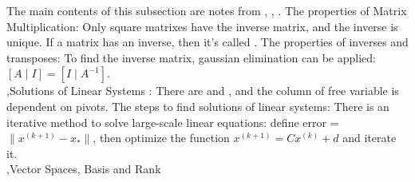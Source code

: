 \documentclass[12pt]{report}
\begin{document}
The main contents of this subsection are notes from \cite{deisenroth2020mathematics}, \cite{axler2023linear}, \cite{petersen2008matrix}.
The properties of Matrix Multiplication:
Only square matrixes have the inverse matrix, and the inverse is unique. If a matrix has an inverse, then it's called .
The properties of inverses and transposes:
To find the inverse matrix, gaussian elimination can be applied: $[A\mid I]=[I\mid A^{-1}]$.\\
\sep{Solutions of Linear Systems}
:
There are  and , and the column of free variable is dependent on pivots. The steps to find solutions of linear systems:
There is an iterative method to solve large-scale linear equations:
define error = $\|x^{(k+1)}-x_*\|$, then optimize the function $x^{(k+1)}=Cx^{(k)}+d$ and iterate it.\\
\sep{Vector Spaces, Basis and Rank}
\end{document}
